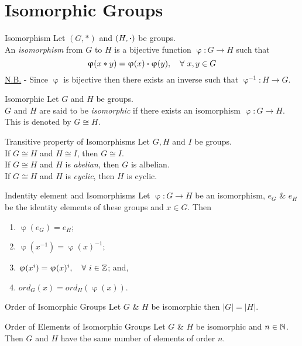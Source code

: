 \documentclass[11pt,a4paper]{article}
\begin{document}
\section{Isomorphic Groups}

\subtitle{Definition 9.01 - }{Isomorphism}
Let $(G, *)$ and $(H, \boldsymbol{\cdot})$ be groups.\\
An \textit{isomorphism} from $G$ to $H$ is a bijective function $\upvarphi : G \to H$ such that $$\upvarphi(x * y) = \upvarphi(x) \boldsymbol{\cdot} \upvarphi(y),\quad \forall\ x, y \in G$$
\underline{N.B.} - Since $\upvarphi$ is bijective then there exists an inverse such that $\upvarphi^{-1} : H \to G$.\\

\subtitle{Definition 9.02 - }{Isomorphic}
Let $G$ and $H$ be groups.\\
$G$ and $H$ are said to be \textit{isomorphic} if there exists an isomorphism $\upvarphi : G \to H$. This is denoted by $G \cong H$.\\

\subtitle{Proposition 9.03 - }{Transitive property of Isomorphisms}
Let $G, H$ and $I$ be groups.\\
If $G \cong H$  and $H \cong I$, then $G \cong I$.\\
If $G \cong H$ and $H$ is \textit{abelian}, then $G$ is albelian.\\
If $G \cong H$ and $H$ is \textit{cyclic}, then $H$ is cyclic.\\

\subtitle{Proposition 9.04 - }{Indentity element and Isomorphisms}
Let $\upvarphi : G \to H$ be an isomorphism, $e_G$ \& $e_H$ be the identity elements of these groups and $x \in G$. Then
\begin{enumerate}[label=\roman*)]
  \item $\upvarphi(e_G) = e_H$;
  \item $\upvarphi(x^{-1}) = \upvarphi(x)^{-1}$;
  \item $\upvarphi(x^i) = \upvarphi(x)^i,\quad \forall\ i \in \mathbb{Z}$; and,
  \item $ord_G(x) = ord_H(\upvarphi(x))$.\\
\end{enumerate}

\subtitle{Proposition 9.05 - }{Order of Isomorphic Groups}
Let $G$ \& $H$ be isomorphic then $|G| = |H|$.\\

\subtitle{Proposition 9.06 - }{Order of Elements of Isomorphic Groups}
Let $G$ \& $H$ be isomorphic and $n \in \mathbb{N}$.\\
Then $G$ and $H$ have the same number of elements of order $n$.
\end{document}
